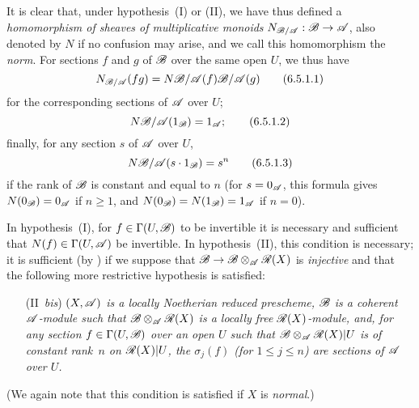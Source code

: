 \begin{env}[6.5.1]
It is clear that, under hypothesis~(I) or (II), we have thus defined a \emph{homomorphism of sheaves of multiplicative monoids} $N_{\sh{B}/\sh{A}}:\sh{B}\to\sh{A}$, also denoted by $N$ if no confusion may arise, and we call this homomorphism the \emph{norm}.
For sections $f$ and $g$ of $\mathscr{B}$ over the same open $U$, we thus have
\[
\label{II.6.5.1.1}
  N_{\mathscr{B}/\mathscr{A}}(fg) = N{\mathscr{B}/\mathscr{A}}(f){\mathscr{B}/\mathscr{A}}(g)
\tag{6.5.1.1}
\]
for the corresponding sections of $\mathscr{A}$ over $U$;
\[
\label{II.6.5.1.2}
  N{\mathscr{B}/\mathscr{A}}(1_{\mathscr{B}}) = 1_{\mathscr{A}};
\tag{6.5.1.2}
\]
finally, for any section $s$ of $\mathscr{A}$ over $U$,
\[
\label{II.6.5.1.3}
  N{\mathscr{B}/\mathscr{A}}(s\cdot1_{\mathscr{B}}) = s^n
\tag{6.5.1.3}
\]
if the rank of $\mathscr{B}$ is constant and equal to $n$ (for $s=0_{\mathscr{A}}$, this formula gives $N(0_{\mathscr{B}})=0_{\mathscr{A}}$ if $n\geq1$, and $N(0_{\mathscr{B}})=N(1_{\mathscr{B}})=1_{\mathscr{A}}$ if $n=0$).

In hypothesis~(I), for $f\in\Gamma(U,\mathscr{B})$ to be invertible it is necessary and sufficient that $N(f)\in\Gamma(U,\mathscr{A})$ be invertible.
In hypothesis~(II), this condition is necessary;
it is sufficient (by ) if we suppose that $\sh{B}\to\sh{B}\otimes_{\sh{A}}\sh{R}(X)$ is \emph{injective} and that the following more restrictive hypothesis is satisfied:
\begin{enumerate}
  \item[(II~\emph{bis})] \emph{$(X,\mathscr{A})$ is a locally Noetherian reduced prescheme, $\mathscr{B}$ is a coherent $\mathscr{A}$-module such that $\mathscr{B}\otimes_{\mathscr{A}}\mathscr{R}(X)$ is a locally free $\mathscr{R}(X)$-module, and, for any section $f\in\Gamma(U,\mathscr{B})$ over an open $U$ such that $\mathscr{B}\otimes_{\mathscr{A}}\mathscr{R}(X)|U$ is of constant rank~$n$ on $\mathscr{R}(X)|U$, the $\sigma_j(f)$ (for $1\leq j\leq n$) are sections of $\mathscr{A}$ over $U$.}
\end{enumerate}

(We again note that this condition is satisfied if $X$ is \emph{normal}.)
\end{env}

